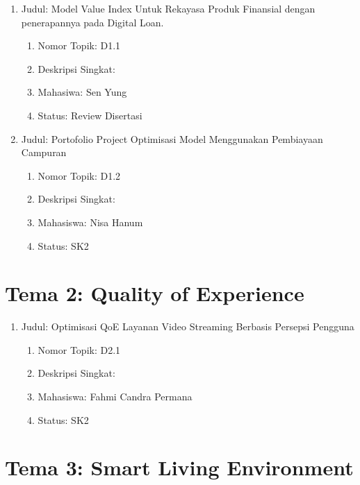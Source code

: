 \documentclass[
  letterpaper,
  DIV=11,
  numbers=noendperiod]{scrreprt}
\begin{document}
\begin{enumerate}
\def\labelenumi{\arabic{enumi}.}
\item
  Judul: Model Value Index Untuk Rekayasa Produk Finansial dengan
  penerapannya pada Digital Loan.

  \begin{enumerate}
  \def\labelenumii{\arabic{enumii}.}
  \item
    Nomor Topik: D1.1
  \item
    Deskripsi Singkat:
  \item
    Mahasiwa: Sen Yung
  \item
    Status: Review Disertasi
  \end{enumerate}
\item
  Judul: Portofolio Project Optimisasi Model Menggunakan Pembiayaan
  Campuran

  \begin{enumerate}
  \def\labelenumii{\arabic{enumii}.}
  \item
    Nomor Topik: D1.2
  \item
    Deskripsi Singkat:
  \item
    Mahasiswa: Nisa Hanum
  \item
    Status: SK2
  \end{enumerate}
\end{enumerate}

\section{Tema 2: Quality of
Experience}\label{tema-2-quality-of-experience}

\begin{enumerate}
\def\labelenumi{\arabic{enumi}.}
\item
  Judul: Optimisasi QoE Layanan Video Streaming Berbasis Persepsi
  Pengguna

  \begin{enumerate}
  \def\labelenumii{\arabic{enumii}.}
  \item
    Nomor Topik: D2.1
  \item
    Deskripsi Singkat:
  \item
    Mahasiswa: Fahmi Candra Permana
  \item
    Status: SK2
  \end{enumerate}
\end{enumerate}

\section{Tema 3: Smart Living
Environment}\label{tema-3-smart-living-environment}
\end{document}
